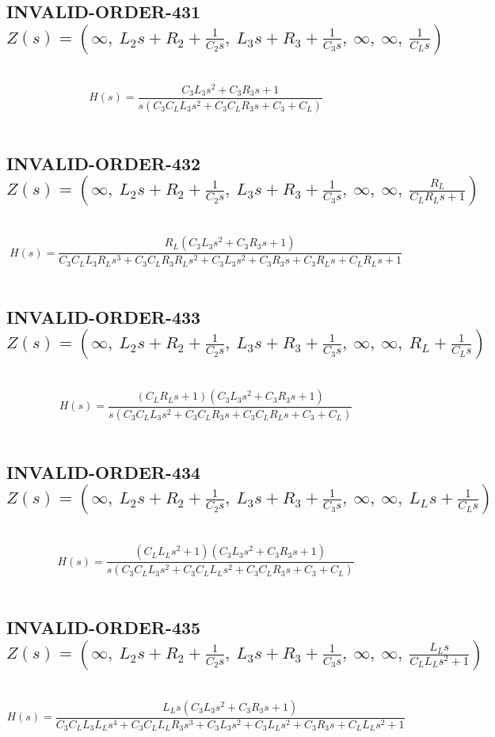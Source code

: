 \documentclass{article}
\begin{document}
\subsection{INVALID-ORDER-431 $Z(s) = \left( \infty, \  L_{2} s + R_{2} + \frac{1}{C_{2} s}, \  L_{3} s + R_{3} + \frac{1}{C_{3} s}, \  \infty, \  \infty, \  \frac{1}{C_{L} s}\right)$ } \ 
\textbf{\[H(s) = \frac{C_{3} L_{3} s^{2} + C_{3} R_{3} s + 1}{s \left(C_{3} C_{L} L_{3} s^{2} + C_{3} C_{L} R_{3} s + C_{3} + C_{L}\right)}\] } \ 
\subsection{INVALID-ORDER-432 $Z(s) = \left( \infty, \  L_{2} s + R_{2} + \frac{1}{C_{2} s}, \  L_{3} s + R_{3} + \frac{1}{C_{3} s}, \  \infty, \  \infty, \  \frac{R_{L}}{C_{L} R_{L} s + 1}\right)$ } \ 
\textbf{\[H(s) = \frac{R_{L} \left(C_{3} L_{3} s^{2} + C_{3} R_{3} s + 1\right)}{C_{3} C_{L} L_{3} R_{L} s^{3} + C_{3} C_{L} R_{3} R_{L} s^{2} + C_{3} L_{3} s^{2} + C_{3} R_{3} s + C_{3} R_{L} s + C_{L} R_{L} s + 1}\] } \ 
\subsection{INVALID-ORDER-433 $Z(s) = \left( \infty, \  L_{2} s + R_{2} + \frac{1}{C_{2} s}, \  L_{3} s + R_{3} + \frac{1}{C_{3} s}, \  \infty, \  \infty, \  R_{L} + \frac{1}{C_{L} s}\right)$ } \ 
\textbf{\[H(s) = \frac{\left(C_{L} R_{L} s + 1\right) \left(C_{3} L_{3} s^{2} + C_{3} R_{3} s + 1\right)}{s \left(C_{3} C_{L} L_{3} s^{2} + C_{3} C_{L} R_{3} s + C_{3} C_{L} R_{L} s + C_{3} + C_{L}\right)}\] } \ 
\subsection{INVALID-ORDER-434 $Z(s) = \left( \infty, \  L_{2} s + R_{2} + \frac{1}{C_{2} s}, \  L_{3} s + R_{3} + \frac{1}{C_{3} s}, \  \infty, \  \infty, \  L_{L} s + \frac{1}{C_{L} s}\right)$ } \ 
\textbf{\[H(s) = \frac{\left(C_{L} L_{L} s^{2} + 1\right) \left(C_{3} L_{3} s^{2} + C_{3} R_{3} s + 1\right)}{s \left(C_{3} C_{L} L_{3} s^{2} + C_{3} C_{L} L_{L} s^{2} + C_{3} C_{L} R_{3} s + C_{3} + C_{L}\right)}\] } \ 
\subsection{INVALID-ORDER-435 $Z(s) = \left( \infty, \  L_{2} s + R_{2} + \frac{1}{C_{2} s}, \  L_{3} s + R_{3} + \frac{1}{C_{3} s}, \  \infty, \  \infty, \  \frac{L_{L} s}{C_{L} L_{L} s^{2} + 1}\right)$ } \ 
\textbf{\[H(s) = \frac{L_{L} s \left(C_{3} L_{3} s^{2} + C_{3} R_{3} s + 1\right)}{C_{3} C_{L} L_{3} L_{L} s^{4} + C_{3} C_{L} L_{L} R_{3} s^{3} + C_{3} L_{3} s^{2} + C_{3} L_{L} s^{2} + C_{3} R_{3} s + C_{L} L_{L} s^{2} + 1}\] } \ 
\end{document}
